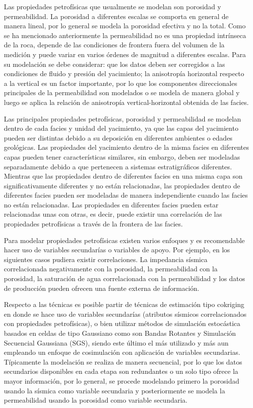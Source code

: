Las propiedades petrof\'isicas que usualmente se modelan son porosidad y permeabilidad. La porosidad a diferentes escalas se comporta en general de manera lineal, por lo general se modela la porosidad efectiva y no la total. Como se ha mencionado anteriormente la permeabilidad no es una propiedad intr\'inseca de la roca, depende de las condiciones de frontera fuera del volumen de la medici\'on y puede variar en varios \'ordenes de magnitud a diferentes escalas. Para su modelaci\'on se debe considerar: que los datos deben ser corregidos a las condiciones de fluido y presi\'on del yacimiento; la anisotrop\'ia horizontal respecto a la vertical es un factor importante, por lo que los componentes direccionales principales de la permeabilidad son modelados o se modela de manera global y luego se aplica la relaci\'on de anisotrop\'ia vertical-horizontal obtenida de las facies.

Las principales propiedades petrof\'isicas, porosidad y permeabilidad se modelan dentro de cada facies y unidad del yacimiento, ya que las capas del yacimiento pueden ser distintas debido a su deposici\'on en diferentes ambientes o edades geol\'ogicas. Las propiedades del yacimiento dentro de la misma facies en diferentes capas pueden tener caracter\'isticas similares, sin embargo, deben ser modeladas separadamente debido a que pertenecen a sistemas estratigr\'aficos diferentes. Mientras que las propiedades dentro de diferentes facies en una misma capa son significativamente diferentes y no est\'an relacionadas, las propiedades dentro de diferentes facies pueden ser modeladas de manera independiente cuando las facies no est\'an relacionadas. Las propiedades en diferentes facies pueden estar relacionadas unas con otras, es decir, puede existir una correlaci\'on de las propiedades petrof\'isicas a trav\'es de la frontera de las facies.

Para modelar propiedades petrof\'isicas existen varios enfoques y es recomendable hacer uso de variables secundar\'ias o variables de apoyo. Por ejemplo, en los siguientes casos pudiera existir correlaciones. La impedancia s\'ismica correlacionada negativamente con la porosidad, la permeabilidad con la porosidad, la saturaci\'on de agua correlacionada con la permeabilidad y los datos de producci\'on pueden ofrecen una fuente externa de informaci\'on.

Respecto a las t\'ecnicas es posible partir de t\'ecnicas de estimaci\'on tipo cokriging en donde se hace uso de variables secundar\'ias (atributos s\'ismicos correlacionados con propiedades petrof\'isicas), o bien utilizar m\'etodos de simulaci\'on estoc\'astica basados en celdas de tipo Gaussiano como son Bandas Rotantes y Simulaci\'on Secuencial Gaussiana (SGS), siendo este \'ultimo el m\'as utilizado y m\'as aun empleando un enfoque de cosimulaci\'on con aplicaci\'on de variables secundarias. T\'ipicamente la modelaci\'on se realiza de manera secuencial, por lo que los datos secundarios disponibles en cada etapa son redundantes o un solo tipo ofrece la mayor informaci\'on, por lo general, se procede modelando primero la porosidad usando la s\'ismica como variable secundaria y posteriormente se  modela la permeabilidad usando la porosidad como variable secundaria.

